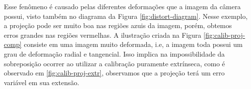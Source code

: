 Esse fenômeno é causado pelas diferentes deformações que a imagem da câmera possui, visto também no diagrama da Figura \ref{fig:distort-diagram}. Nesse exemplo, a projeção pode ser muito boa nas regiões azuis da imagem, porém, obtemos erros grandes nas regiões vermelhas. A ilustração criada na Figura \ref{fig:calib-proj-comp} consiste em uma imagem muito deformada, i.e, a imagem toda possui um grau de deformação radial e tangencial. Isso implica na impossibilidade da sobreposição ocorrer ao utilizar a calibração puramente extrínseca, como é observado em \ref{fig:calib-proj-extr}, observamos que a projeção terá um erro variável em sua extensão.
